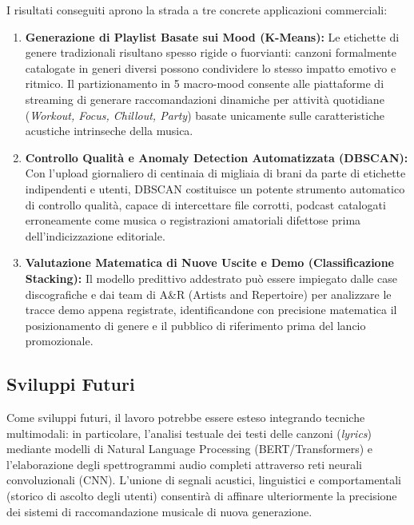 \documentclass[12pt,a4paper]{article}
\begin{document}
I risultati conseguiti aprono la strada a tre concrete applicazioni commerciali:
\begin{enumerate}
    \item \textbf{Generazione di Playlist Basate sui Mood (K-Means):} Le etichette di genere tradizionali risultano spesso rigide o fuorvianti: canzoni formalmente catalogate in generi diversi possono condividere lo stesso impatto emotivo e ritmico. Il partizionamento in 5 macro-mood consente alle piattaforme di streaming di generare raccomandazioni dinamiche per attività quotidiane (\textit{Workout, Focus, Chillout, Party}) basate unicamente sulle caratteristiche acustiche intrinseche della musica.
    \item \textbf{Controllo Qualità e Anomaly Detection Automatizzata (DBSCAN):} Con l'upload giornaliero di centinaia di migliaia di brani da parte di etichette indipendenti e utenti, DBSCAN costituisce un potente strumento automatico di controllo qualità, capace di intercettare file corrotti, podcast catalogati erroneamente come musica o registrazioni amatoriali difettose prima dell'indicizzazione editoriale.
    \item \textbf{Valutazione Matematica di Nuove Uscite e Demo (Classificazione Stacking):} Il modello predittivo addestrato può essere impiegato dalle case discografiche e dai team di A\&R (Artists and Repertoire) per analizzare le tracce demo appena registrate, identificandone con precisione matematica il posizionamento di genere e il pubblico di riferimento prima del lancio promozionale.
\end{enumerate}

\subsection{Sviluppi Futuri}

Come sviluppi futuri, il lavoro potrebbe essere esteso integrando tecniche multimodali: in particolare, l'analisi testuale dei testi delle canzoni (\textit{lyrics}) mediante modelli di Natural Language Processing (BERT/Transformers) e l'elaborazione degli spettrogrammi audio completi attraverso reti neurali convoluzionali (CNN). L'unione di segnali acustici, linguistici e comportamentali (storico di ascolto degli utenti) consentirà di affinare ulteriormente la precisione dei sistemi di raccomandazione musicale di nuova generazione.

\newpage
{}
\listoffigures
\end{document}
